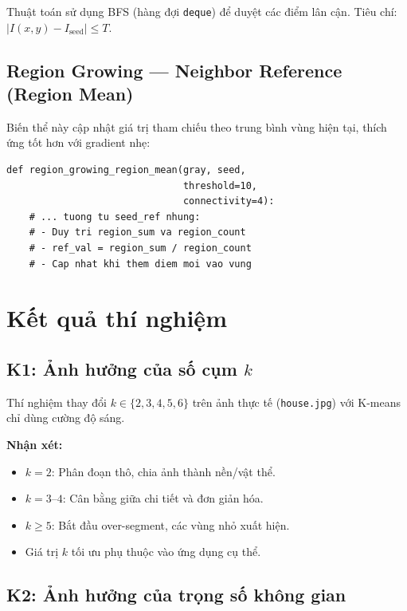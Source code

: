 \documentclass[12pt,a4paper]{article}
\begin{document}
Thuật toán sử dụng BFS (hàng đợi \texttt{deque}) để duyệt các điểm lân cận. Tiêu chí: $|I(x,y) - I_{\mathrm{seed}}| \leq T$.

\subsection{Region Growing --- Neighbor Reference (Region Mean)}

Biến thể này cập nhật giá trị tham chiếu theo trung bình vùng hiện tại, thích ứng tốt hơn với gradient nhẹ:

\begin{lstlisting}
def region_growing_region_mean(gray, seed,
                               threshold=10,
                               connectivity=4):
    # ... tuong tu seed_ref nhung:
    # - Duy tri region_sum va region_count
    # - ref_val = region_sum / region_count
    # - Cap nhat khi them diem moi vao vung
\end{lstlisting}

\section{Kết quả thí nghiệm}

\subsection{K1: Ảnh hưởng của số cụm $k$}

Thí nghiệm thay đổi $k \in \{2, 3, 4, 5, 6\}$ trên ảnh thực tế (\texttt{house.jpg}) với K-means chỉ dùng cường độ sáng.

\textbf{Nhận xét:}
\begin{itemize}
    \item $k = 2$: Phân đoạn thô, chia ảnh thành nền/vật thể.
    \item $k = 3$--$4$: Cân bằng giữa chi tiết và đơn giản hóa.
    \item $k \geq 5$: Bắt đầu over-segment, các vùng nhỏ xuất hiện.
    \item Giá trị $k$ tối ưu phụ thuộc vào ứng dụng cụ thể.
\end{itemize}

\subsection{K2: Ảnh hưởng của trọng số không gian}
\end{document}
